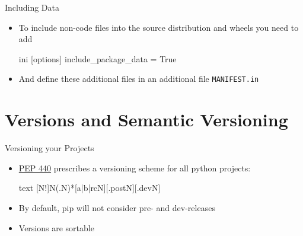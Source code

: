 \begin{frame}[c,fragile]{Including Data}
  \begin{itemize}
    \item To include non-code files into the source distribution and wheels you need to add
      \begin{code}[title={setup.cfg}]{ini}
      [options]
      include_package_data = True
      \end{code}
    \item And define these additional files in an additional file \texttt{MANIFEST.in}
  \end{itemize}
\end{frame}


\section{Versions and Semantic Versioning}
\begin{frame}[fragile, c]{Versioning your Projects}
  \begin{itemize}
    \item \href{https://www.python.org/dev/peps/pep-0440}{PEP 440} prescribes a versioning scheme for all python projects:
      \begin{code}{text}
      [N!]N(.N)*[{a|b|rc}N][.postN][.devN]
      \end{code}
    \item By default, pip will not consider pre- and dev-releases
    \item Versions are sortable
  \end{itemize}
\end{frame}

